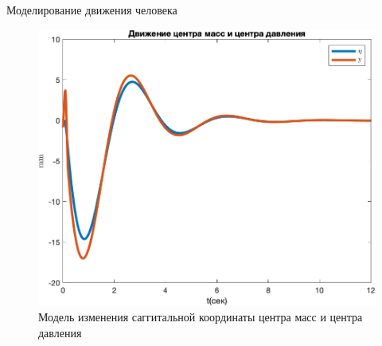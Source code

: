 \documentclass[10pt]{beamer}
\begin{document}
\begin{frame}{Моделирование движения человека}
	\begin{figure}[h!]
		\includegraphics[width=0.7\linewidth]{images/cm_my_1.png}
		\caption{Модель изменения саггитальной координаты центра масс и центра давления}
	\end{figure}
\end{frame}
\end{document}
